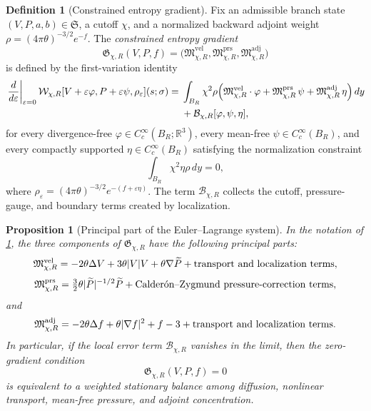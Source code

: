 \documentclass[11pt]{amsart}
\numberwithin{equation}{section}
\theoremstyle{plain}
\newtheorem{proposition}[theorem]{Proposition}
\theoremstyle{definition}
\newtheorem{definition}[theorem]{Definition}
\theoremstyle{remark}
\newcommand{\R}{\mathbb R}
\newcommand{\Wloc}{\mathcal W}
\newcommand{\EntropyGrad}{\mathfrak G}
\newcommand{\State}{\mathfrak S}
\begin{document}
\begin{definition}[Constrained entropy gradient]
\label{def:entropy-gradient}
Fix an admissible branch state \((V,P,a,b)\in\State\), a cutoff \(\chi\), and
a normalized backward adjoint weight \(\rho=(4\pi\theta)^{-3/2}e^{-f}\).  The
\emph{constrained entropy gradient}
\[
	\EntropyGrad_{\chi,R}(V,P,f)
	=\bigl(\mathfrak M^{\mathrm{vel}}_{\chi,R},
		\mathfrak M^{\mathrm{prs}}_{\chi,R},
		\mathfrak M^{\mathrm{adj}}_{\chi,R}\bigr)
\]
is defined by the first-variation identity
\begin{equation}\label{eq:first-variation-identity}
\begin{aligned}
	\left.\frac{d}{d\varepsilon}\right|_{\varepsilon=0}
	\Wloc_{\chi,R}[V+\varepsilon\varphi,P+\varepsilon\psi,\rho_\varepsilon](s;\sigma)
	= {} & \int_{B_R}\chi^2\rho
	\Bigl(
			\mathfrak M^{\mathrm{vel}}_{\chi,R}\cdot\varphi
		+ \mathfrak M^{\mathrm{prs}}_{\chi,R}\,\psi
		+ \mathfrak M^{\mathrm{adj}}_{\chi,R}\,\eta
	\Bigr)\,dy \\
	& {} + \mathcal B_{\chi,R}[\varphi,\psi,\eta],
\end{aligned}
\end{equation}
for every divergence-free \(\varphi\in C_c^\infty(B_R;\R^3)\), every mean-free
\(\psi\in C_c^\infty(B_R)\), and every compactly supported \(\eta\in C_c^\infty(B_R)\)
satisfying the normalization constraint
\[
	\int_{B_R}\chi^2\eta\rho\,dy=0,
\]
where \(\rho_\varepsilon=(4\pi\theta)^{-3/2}e^{-(f+\varepsilon\eta)}\).  The term
\(\mathcal B_{\chi,R}\) collects the cutoff, pressure-gauge, and boundary terms
created by localization.
\end{definition}

\begin{proposition}[Principal part of the Euler--Lagrange system]
\label{prop:principal-part}
In the notation of \cref{def:entropy-gradient}, the three components of
\(\EntropyGrad_{\chi,R}\) have the following principal parts:
\begin{equation}\label{eq:vel-principal}
	\mathfrak M^{\mathrm{vel}}_{\chi,R}
	= -2\theta\Delta V + 3\theta |V|V + \theta\nabla \widetilde P
		+ \textup{transport and localization terms},
\end{equation}
\begin{equation}\label{eq:prs-principal}
	\mathfrak M^{\mathrm{prs}}_{\chi,R}
	= \tfrac32\theta |\widetilde P|^{-1/2}\widetilde P
		+ \textup{Calder\'on--Zygmund pressure-correction terms},
\end{equation}
and
\begin{equation}\label{eq:adj-principal}
	\mathfrak M^{\mathrm{adj}}_{\chi,R}
	= -2\theta\Delta f + \theta |\nabla f|^2 + f - 3
		+ \textup{transport and localization terms}.
\end{equation}
In particular, if the local error term \(\mathcal B_{\chi,R}\) vanishes in the
limit, then the zero-gradient condition
\[
	\EntropyGrad_{\chi,R}(V,P,f)=0
\]
is equivalent to a weighted stationary balance among diffusion, nonlinear
transport, mean-free pressure, and adjoint concentration.
\end{proposition}
\end{document}
